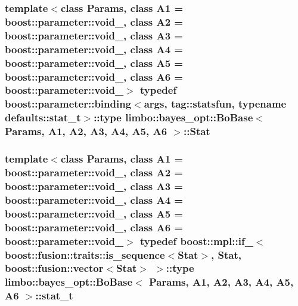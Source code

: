 \subsubsection[{Stat}]{\setlength{\rightskip}{0pt plus 5cm}template$<$class Params, class A1 = boost\+::parameter\+::void\+\_\+, class A2 = boost\+::parameter\+::void\+\_\+, class A3 = boost\+::parameter\+::void\+\_\+, class A4 = boost\+::parameter\+::void\+\_\+, class A5 = boost\+::parameter\+::void\+\_\+, class A6 = boost\+::parameter\+::void\+\_\+$>$ typedef boost\+::parameter\+::binding$<${\bf args}, tag\+::statsfun, typename {\bf defaults\+::stat\+\_\+t}$>$\+::type {\bf limbo\+::bayes\+\_\+opt\+::\+Bo\+Base}$<$ Params, A1, A2, A3, A4, A5, A6 $>$\+::{\bf Stat}}\label{classlimbo_1_1bayes__opt_1_1_bo_base_adda0d6bf0fa0def996eb0af7e8a84f3f}
\hypertarget{classlimbo_1_1bayes__opt_1_1_bo_base_a17d395abfdd3158f238c83764ba68fd0}{}
\subsubsection[{stat\+\_\+t}]{\setlength{\rightskip}{0pt plus 5cm}template$<$class Params, class A1 = boost\+::parameter\+::void\+\_\+, class A2 = boost\+::parameter\+::void\+\_\+, class A3 = boost\+::parameter\+::void\+\_\+, class A4 = boost\+::parameter\+::void\+\_\+, class A5 = boost\+::parameter\+::void\+\_\+, class A6 = boost\+::parameter\+::void\+\_\+$>$ typedef boost\+::mpl\+::if\+\_\+$<$boost\+::fusion\+::traits\+::is\+\_\+sequence$<${\bf Stat}$>$, {\bf Stat}, boost\+::fusion\+::vector$<${\bf Stat}$>$ $>$\+::type {\bf limbo\+::bayes\+\_\+opt\+::\+Bo\+Base}$<$ Params, A1, A2, A3, A4, A5, A6 $>$\+::{\bf stat\+\_\+t}}\label{classlimbo_1_1bayes__opt_1_1_bo_base_a17d395abfdd3158f238c83764ba68fd0}
\hypertarget{classlimbo_1_1bayes__opt_1_1_bo_base_a8dfcab20696e6c85665b150e9881c010}{}
